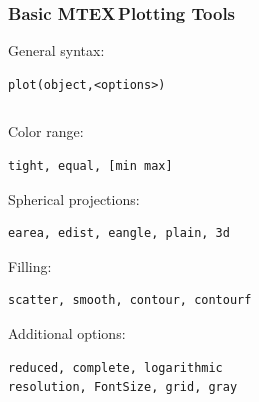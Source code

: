 \documentclass{beamer}
\newcommand{\MTEX}{{\bf {\color{red}M}TEX\,}}%
\begin{document}
\begin{frame}[fragile]
  \frametitle{Basic \MTEX Plotting Tools}

General syntax:
\begin{lstlisting}
plot(object,<options>)
\end{lstlisting}

\begin{columns}
  \begin{column}{8.5cm}

    
    
    
    
    Color range:
  
\begin{lstlisting}
tight, equal, [min max]
\end{lstlisting}       
 
    Spherical projections:
\begin{lstlisting}
earea, edist, eangle, plain, 3d
\end{lstlisting}
  
    Filling:
\begin{lstlisting}
scatter, smooth, contour, contourf
\end{lstlisting}
  
    Additional options:
\begin{lstlisting}
reduced, complete, logarithmic
resolution, FontSize, grid, gray
\end{lstlisting}        

              
  \end{column}


\end{columns}
\end{frame}
\end{document}

